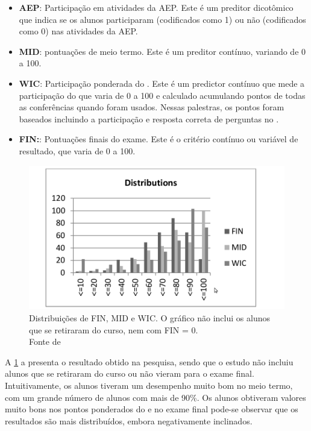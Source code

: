 \begin{itemize}
	\item \textbf{AEP}: Participação em atividades da AEP. Este é um preditor dicotômico que indica se os alunos participaram (codificados como 1) ou não (codificados como 0) nas atividades da AEP.
	
	\item \textbf{MID}: pontuações de meio termo. Este é um preditor contínuo, variando de 0 a 100.
	
	\item \textbf{WIC}: Participação ponderada do . Este é um predictor contínuo que mede a participação do  que varia de 0 a 100 e calculado acumulando pontos de todas as conferências quando  foram usados. Nessas palestras, os pontos foram baseados incluindo a participação e resposta correta de perguntas no .
	
	\item \textbf{FIN:}: Pontuações finais do exame. Este é o critério contínuo ou variável de resultado, que varia de 0 a 100.
\end{itemize}

\begin{figure}[h]
	\centering
	\captionsetup{justification=centering}
	\includegraphics[width=.8\linewidth]{imagens/cukierman.png}
	\caption{Distribuições de FIN, MID e WIC. O gráfico não inclui os alunos que se retiraram do curso, nem com FIN = 0. \\ Fonte de }
	\label{figura:resultadoCukierman}
\end{figure}

A \cref{figura:resultadoCukierman} a presenta o resultado obtido na pesquisa, sendo que o estudo não incluiu alunos que se retiraram do curso ou não vieram para o exame final. Intuitivamente, os alunos tiveram um desempenho muito bom no meio termo, com um grande número de alunos com mais de 90\%. Os alunos obtiveram valores muito bons nos pontos ponderados do  e no exame final pode-se observar que os resultados são mais distribuídos, embora negativamente inclinados.

